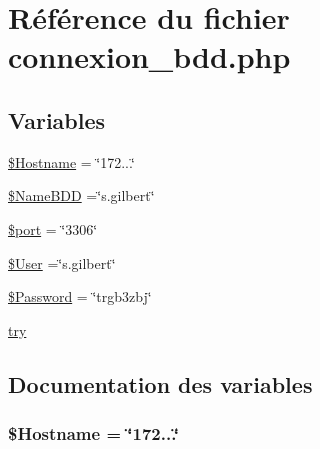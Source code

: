 \hypertarget{connexion__bdd_8php}{}\section{Référence du fichier connexion\+\_\+bdd.\+php}
\label{connexion__bdd_8php}
\subsection*{Variables}
\begin{DoxyCompactItemize}
\item 
\hyperlink{connexion__bdd_8php_a48a6eac112dcc8617b4001d985b656c8}{\$\+Hostname} = \char`\"{}172...\char`\"{}
\item 
\hyperlink{connexion__bdd_8php_a19845241e4666c5c9f322aa6411540ec}{\$\+Name\+B\+D\+D} =\char`\"{}s.\+gilbert\char`\"{}
\item 
\hyperlink{connexion__bdd_8php_aa0787efab4b22e8a212882f3409d4c77}{\$port} = \char`\"{}3306\char`\"{}
\item 
\hyperlink{connexion__bdd_8php_a77cc6ebf3902e67557ab5de9317a11c2}{\$\+User} =\char`\"{}s.\+gilbert\char`\"{}
\item 
\hyperlink{connexion__bdd_8php_ae3ac8512c0fd8924c7112671ead08cf7}{\$\+Password} = \char`\"{}trgb3zbj\char`\"{}
\item 
\hyperlink{connexion__bdd_8php_abe4cc9788f52e49485473dc699537388}{try}
\end{DoxyCompactItemize}


\subsection{Documentation des variables}
\hypertarget{connexion__bdd_8php_a48a6eac112dcc8617b4001d985b656c8}{}
\subsubsection[{\$\+Hostname}]{\setlength{\rightskip}{0pt plus 5cm}\$Hostname = \char`\"{}172...\char`\"{}}\label{connexion__bdd_8php_a48a6eac112dcc8617b4001d985b656c8}
\hypertarget{connexion__bdd_8php_a19845241e4666c5c9f322aa6411540ec}{}
